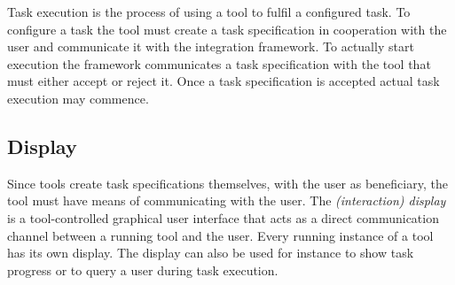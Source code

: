 \documentclass{article}
\begin{document}
   Task execution is the process of using a tool to fulfil a configured task.
   To configure a task the tool must create a task specification in cooperation
   with the user and communicate it with the integration framework. To actually
   start execution the framework communicates a task specification with the
   tool that must either accept or reject it. Once a task specification is
   accepted actual task execution may commence.



  \subsection{Display}

   Since tools create task specifications themselves, with the user as
   beneficiary, the tool must have means of communicating with the user. The
   \textit{(interaction) display} is a tool-controlled graphical user interface
   that acts as a direct communication channel between a running tool and the
   user. Every running instance of a tool has its own display. The display can
   also be used for instance to show task progress or to query a user during
   task execution.


\end{document}
